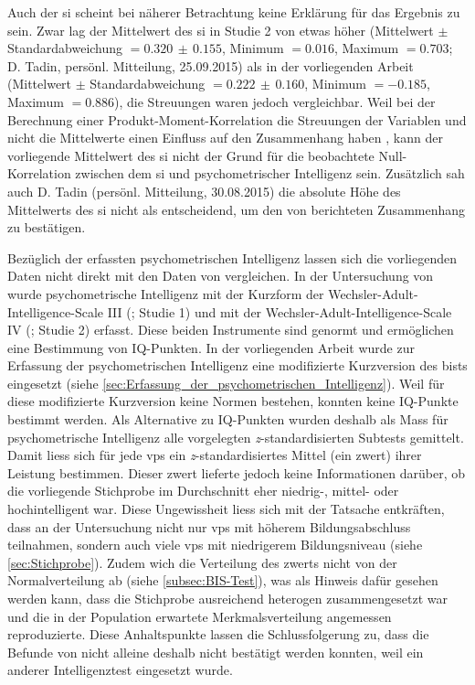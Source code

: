 \documentclass[11pt, twoside, a4paper]{book}		%
\begin{document}
Auch der \gls{si} scheint bei näherer Betrachtung keine Erklärung für das Ergebnis zu sein. Zwar lag der Mittelwert des \gls{si} in Studie 2 von \citet{Melnick2013} etwas höher (Mittelwert $\pm$ Standardabweichung $=0.320\,\pm\,0.155$, Minimum $=0.016$, Maximum $=0.703$; D. Tadin, persönl. Mitteilung, 25.09.2015) als in der vorliegenden Arbeit (Mittelwert $\pm$ Standardabweichung $=0.222\,\pm\,0.160$, Minimum $= -0.185$, Maximum $= 0.886$), die Streuungen waren jedoch vergleichbar. 
Weil bei der Berechnung einer Produkt-Moment-Korrelation die Streuungen der Variablen und nicht die Mittelwerte einen Einfluss auf den Zusammenhang haben \citep[S. 506]{Eid2013}, kann der vorliegende Mittelwert des \gls{si} nicht der Grund für die beobachtete Null-Korrelation zwischen dem \gls{si} und psychometrischer Intelligenz sein. Zusätzlich sah auch D. Tadin (persönl. Mitteilung, 30.08.2015) die absolute Höhe des Mittelwerts des \gls{si} nicht als entscheidend, um den von \citeauthor{Melnick2013} berichteten Zusammenhang zu bestätigen.

Bezüglich der erfassten psychometrischen Intelligenz lassen sich die vorliegenden Daten nicht direkt mit den Daten von \citet{Melnick2013} vergleichen. In der Untersuchung von \citeauthor{Melnick2013} wurde psychometrische Intelligenz mit der Kurzform der Wechsler-Adult-Intelligence-Scale III (\citealp{Axelrod2002}; Studie 1) und mit der Wechsler-Adult-In\-tell\-igence-Scale IV (\citealp{Wechsler2008}; Studie 2) erfasst. Diese beiden Instrumente sind genormt und ermöglichen eine Bestimmung von IQ-Punkten. In der vorliegenden Arbeit wurde zur Erfassung der psychometrischen Intelligenz eine modifizierte Kurzversion des \gls{bist}s eingesetzt (siehe \autoref{sec:Erfassung_der_psychometrischen_Intelligenz}). Weil für diese modifizierte Kurzversion keine Normen bestehen, konnten keine IQ-Punkte bestimmt werden. Als Alternative zu IQ-Punkten wurden deshalb als Mass für psychometrische Intelligenz alle vorgelegten \textit{z}-standardisierten Subtests gemittelt. Damit liess sich für jede \glspl{vp} ein \textit{z}-standardisiertes Mittel (ein \gls{zwert}) ihrer Leistung bestimmen. Dieser \gls{zwert} lieferte jedoch keine Informationen darüber, ob die vorliegende Stichprobe im Durchschnitt eher niedrig-, mittel- oder hochintelligent war. Diese Ungewissheit liess sich mit der Tatsache entkräften, dass an der Untersuchung nicht nur \glspl{vp} mit höherem Bildungsabschluss teilnahmen, sondern auch viele \glspl{vp} mit niedrigerem Bildungsniveau (siehe \autoref{sec:Stichprobe}). 
Zudem wich die Verteilung des \gls{zwert}s nicht von der Normalverteilung ab (siehe \autoref{subsec:BIS-Test}), was als Hinweis dafür gesehen werden kann, dass die Stichprobe ausreichend heterogen zusammengesetzt war und die in der Population erwartete Merkmalsverteilung angemessen reproduzierte. Diese Anhaltspunkte lassen die Schlussfolgerung zu, dass die Befunde von \citeauthor{Melnick2013} nicht alleine deshalb nicht bestätigt werden konnten, weil ein anderer Intelligenztest eingesetzt wurde.
\end{document}
